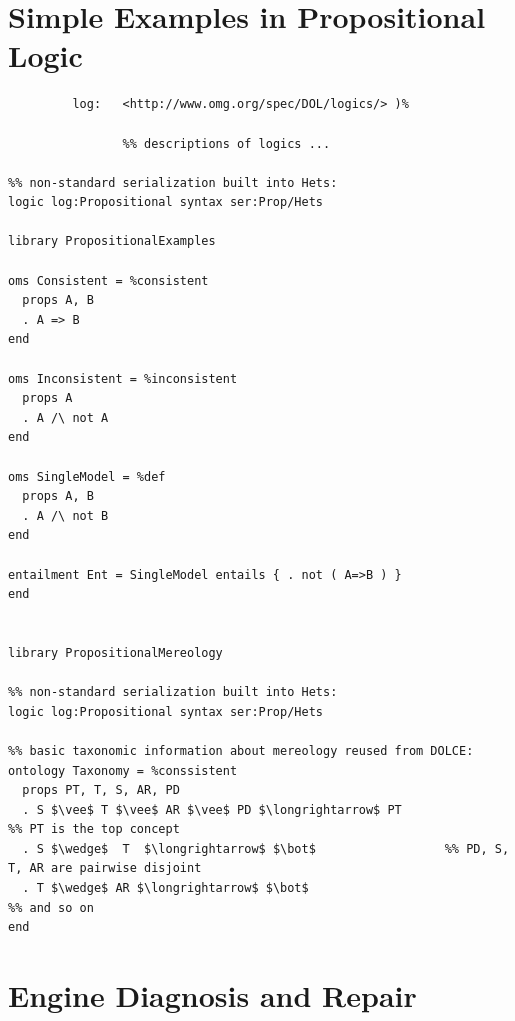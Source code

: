 \documentclass[10pt,fleqn,%
\ifpretendfinal
final%
\else
draft%
\fi,
]{scrreprt}
\newcommand{\sclause}[1]{\section{#1}}
\begin{document}
\sclause{Simple Examples in Propositional Logic}
\begin{lstlisting}[basicstyle=\ttfamily,language=dolText,morekeywords={props,ObjectProperty,Class,DisjointUnionOf,SubClassOf,Characteristics,Transitive,Asymmetric,SubPropertyOf,DisjointClasses,EquivalentTo,inverse,only,forall,iff,if,or,exists},escapechar=@,mathescape]
%prefix( :      <http://www.example.org/prop#>
         log:   <http://www.omg.org/spec/DOL/logics/> )%     

		 		%% descriptions of logics ...

%% non-standard serialization built into Hets: 
logic log:Propositional syntax ser:Prop/Hets       

library PropositionalExamples

oms Consistent = %consistent
  props A, B
  . A => B
end

oms Inconsistent = %inconsistent
  props A
  . A /\ not A
end

oms SingleModel = %def
  props A, B
  . A /\ not B
end

entailment Ent = SingleModel entails { . not ( A=>B ) }
end


library PropositionalMereology

%% non-standard serialization built into Hets: 
logic log:Propositional syntax ser:Prop/Hets       

%% basic taxonomic information about mereology reused from DOLCE:
ontology Taxonomy = %conssistent      
  props PT, T, S, AR, PD
  . S $\vee$ T $\vee$ AR $\vee$ PD $\longrightarrow$ PT                                                    %% PT is the top concept
  . S $\wedge$  T  $\longrightarrow$ $\bot$                  %% PD, S, T, AR are pairwise disjoint
  . T $\wedge$ AR $\longrightarrow$ $\bot$                                                                         %% and so on
end
\end{lstlisting}

\sclause{Engine Diagnosis and Repair}\label{engine}
\end{document}
